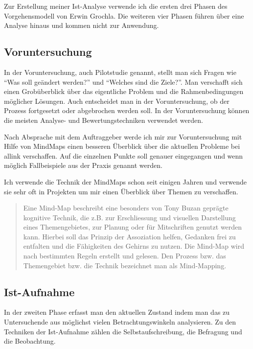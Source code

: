 Zur Erstellung meiner Ist-Analyse verwende ich die ersten drei Phasen des 
Vorgehensmodell von Erwin Grochla\cite[S. 44-74]{grochla1982grundlagen}.
Die weiteren vier Phasen führen über eine Analyse hinaus und kommen
nicht zur Anwendung.

\subsection{Voruntersuchung}
In der Voruntersuchung, auch Pilotstudie genannt, stellt man sich Fragen wie
``Was soll geändert werden?'' und ``Welches sind die Ziele?''. Man verschafft
sich einen Grobüberblick über das eigentliche Problem und die Rahmenbedingungen
möglicher Lösungen. Auch entscheidet man in der Voruntersuchung, ob der Prozess
fortgesetzt oder abgebrochen werden soll. In der Voruntersuchung können die 
meisten Analyse- und Bewertungstechniken verwendet werden.

Nach Absprache mit dem Auftraggeber werde ich mir zur Voruntersuchung mit  
Hilfe von MindMaps einen besseren Überblick über die aktuellen Probleme bei
allink verschaffen. Auf die einzelnen Punkte soll genauer eingegangen
und wenn möglich Fallbeispiele aus der Praxis genannt werden.

Ich verwende die Technik der MindMaps schon seit einigen Jahren und verwende
sie sehr oft in Projekten um mir einen Überblick über Themen zu verschaffen.

\begin{quote}
Eine Mind-Map beschreibt eine besonders von Tony Buzan geprägte kognitive 
Technik, die z.B. zur Erschliessung und visuellen Darstellung eines Themengebietes, 
zur Planung oder für Mitschriften genutzt werden kann. Hierbei soll das Prinzip 
der Assoziation helfen, Gedanken frei zu entfalten und die Fähigkeiten des Gehirns 
zu nutzen. Die Mind-Map wird nach bestimmten Regeln erstellt und gelesen. Den 
Prozess bzw. das Themengebiet bzw. die Technik bezeichnet man als Mind-Mapping.
\cite{wikipedia_mindmap}
\end{quote}

\subsection{Ist-Aufnahme}
In der zweiten Phase erfasst man den aktuellen Zustand indem man das zu 
Untersuchende aus möglichst vielen Betrachtungswinkeln analysieren. Zu den
Techniken der Ist-Aufnahme zählen die Selbstaufschreibung, die Befragung und 
die Beobachtung.

